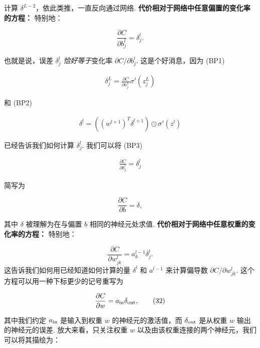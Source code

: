 \noindent 计算 $\delta^{L-2}$，依此类推，一直反向通过网络. \textbf{代价相对于网络中任意偏置的变化率的方程：} 特别地：

\begin{equation}
\frac{\partial C}{\partial b^l_j} = \delta^l_j.
\tag{BP3}
\end{equation}

\noindent 也就是说，误差 $\delta^l_j$ \emph{恰好等于}变化率 $\partial C / \partial b^l_j$. 这是个好消息，因为 (BP1)

\begin{align*}
\delta^L_j = \frac{\partial C}{\partial a^L_j} \sigma'(z^L_j) \nonumber
\end{align*}

\noindent 和 (BP2)

\begin{align*}
\delta^l = ((w^{l+1})^T \delta^{l+1}) \odot \sigma'(z^l) \nonumber
\end{align*}

\noindent 已经告诉我们如何计算 $\delta^l_j$. 我们可以将 (BP3)

\begin{align*}
\frac{\partial C}{\partial b^l_j} = \delta^l_j \nonumber
\end{align*}

\noindent 简写为

\begin{equation}
\frac{\partial C}{\partial b} = \delta,
\tag{31}
\end{equation}

\noindent 其中 $\delta$ 被理解为在与偏置 $b$ 相同的神经元处求值. \textbf{代价相对于网络中任意权重的变化率的方程：} 特别地：

\begin{equation}
\frac{\partial C}{\partial w^l_{jk}} = a^{l-1}_k \delta^l_j.
\tag{BP4}
\end{equation}
\noindent 这告诉我们如何用已经知道如何计算的量 $\delta^l$ 和 $a^{l-1}$ 来计算偏导数 $\partial C / \partial w^l_{jk}$. 这个方程可以用一种下标更少的记号重写为

\begin{equation}
\frac{\partial C}{\partial w} = a_{\rm in} \delta_{\rm out},
\tag{32}
\end{equation}

\noindent 其中我们约定 $a_{\rm in}$ 是输入到权重 $w$ 的神经元的激活值，而 $\delta_{\rm out}$ 是从权重 $w$ 输出的神经元的误差. 放大来看，只关注权重 $w$ 以及由该权重连接的两个神经元，我们可以将其描绘为：

